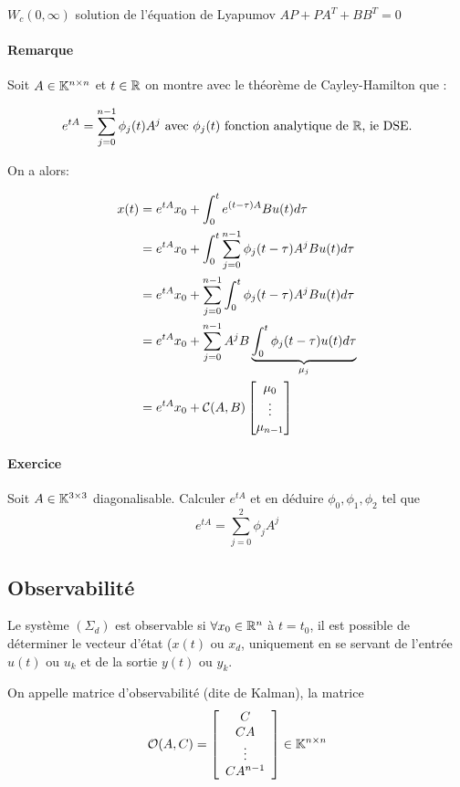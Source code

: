 \documentclass[main.tex]{subfiles}
\begin{document}
\begin{prop}
$W_c(0,\infty)$ solution de l'équation de Lyapumov $AP + PA^T+BB^T=0$
\end{prop}
\paragraph{Remarque}
Soit $A \in \mathbb{K}^{n\times n}$ et $t\in \mathbb{R}$  on montre avec le théorème de Cayley-Hamilton  que :

\[
 e^{tA} = \sum_{j=0}^{n-1} \phi_j(t)A^j \text{ avec } \phi_j(t) \text{ fonction  analytique de $\mathbb{R}$, ie DSE.}
\]


On a alors:

\begin{align*}
  x(t) &=  e^{tA}x_0+ \int_0^t e^{(t-\tau)A}Bu(t)d\tau\\
       &=e^{tA}x_0 +  \int_0^t \sum_{j=0}^{n-1} \phi_j(t-\tau)A^j B u(t)d\tau \\
       &=e^{tA}x_0 +  \sum_{j=0}^{n-1} \int_0^t \phi_j(t-\tau)A^j B u(t)d\tau \\
       &=e^{tA}x_0 +  \sum_{j=0}^{n-1}  A^jB  \underbrace{\int_0^t \phi_j(t-\tau)u(t)d\tau}_{\mu_j}\\
       &= e^{tA}x_0 + \mathcal{C}(A,B) \begin{bmatrix} \mu_0 \\ \vdots\\ \mu_{n-1} \end{bmatrix}
\end{align*}

\paragraph{Exercice}
\begin{it}
  Soit $A\in\mathbb{K}^{3\times3}$ diagonalisable. Calculer $e^{tA}$ et en déduire $\phi_0,\phi_1,\phi_2$ tel que \[e^{tA}=\sum_{j=0}^{2}\phi_jA^j\]
\end{it}


\subsection{Observabilité}

\begin{defin}
  Le système $(\Sigma_d)$ est observable si $\forall x_0 \in \mathbb{R}^n$ à
    $t=t_0$, il est possible de déterminer le vecteur d'état ($x(t)$ ou $x_d$, uniquement en se servant de l'entrée $u(t)$ ou $u_k$ et de la sortie $y(t)$ ou $y_k$.
\end{defin}

\begin{defin}
On appelle matrice d'observabilité (dite de Kalman), la matrice
\[ \mathcal{O}(A,C) = \left[ \begin{array}{c}
C \\
CA \\
\vdots \\
CA^{n-1}
\end{array} \right]
\in \mathbb{K}^{n\times n}
\]
\end{defin}
\end{document}
